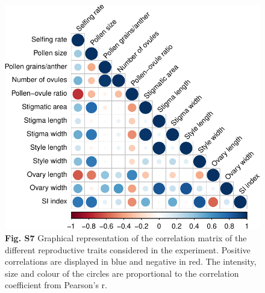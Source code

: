 \documentclass[12pt,]{article}
\begin{document}
\begin{figure}
\centering
\includegraphics{Supp_Material_files/figure-latex/unnamed-chunk-16-1.pdf}
\caption{\textbf{Fig. S7} Graphical representation of the correlation
matrix of the different reproductive traits considered in the
experiment. Positive correlations are displayed in blue and negative in
red. The intensity, size and colour of the circles are proportional to
the correlation coefficient from Pearson's r.}
\end{figure}

\clearpage
\end{document}
